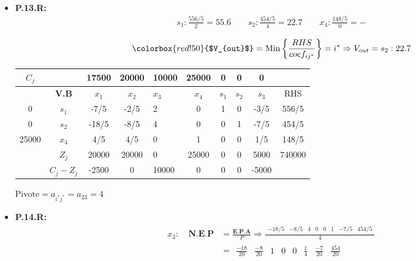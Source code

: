 \documentclass{templateNote}
\begin{document}
\begin{itemize}
    \item \textbf{P.13.R:}
    \begin{align*}
        s_1: \frac{556/5}{2} = 55.6 \qquad s_2: \frac{454/5}{4} = 22.7 \qquad x_4: \frac{148/5}{0} = - \\
    \end{align*}
    \begin{equation*}
        \colorbox{red!50}{$V_{out}$} = \text{Min} \left\{ \frac{RHS}{coef_{ij^*}} \right\} = i^* \Rightarrow V_{out} = s_2 : 22.7
    \end{equation*}

    \begin{center}
        \begin{tabular}{|c|c|c|c|g|c|c|c|c|c|}
            \hline
            $C_j$ & & 17500 & 20000 & 10000 & 25000 & 0 & 0 & 0 & \\ \hline
            & \textbf{V.B} & $x_1$ & $x_2$ & $x_3$ & $x_4$ & $s_1$ & $s_2$ & $s_3$ & RHS \\  & $s_1$ & -7/5 & -2/5 & 2 & 0 & 1 & 0 & -3/5 & 556/5 \\
            0 & $s_2$ & -18/5 & -8/5 & 4 & 0 & 0 & 1 & -7/5 & 454/5 \\
            25000 & $x_4$ & 4/5 & 4/5 & 0 & 1 & 0 & 0 & 1/5 & 148/5 \\ \hline
            & $Z_j$ & 20000 & 20000 & 0 & 25000 & 0 & 0 & 5000 & $\underline{740000}$ \\ \hline
            & $C_j - Z_j$ & -2500 & 0 & 10000 & 0 & 0 & 0 & -5000 & \\ \hline
        \end{tabular}
    \end{center}
    \begin{center}
        $\text{Pivote} = a_{i^*j^*} = a_{23} = 4$
    \end{center}

    \item \textbf{P.14.R:}
    \begin{align*}
        x_3: \quad \textbf{N.E.P} &= \frac{\textbf{E.P.A}}{P} \Rightarrow \frac{\begin{array}{cccccccc} -18/5 & -8/5 & 4 & 0 & 0 & 1 & -7/5 & 454/5\end{array}}{4} \\ &= \begin{array}{cccccccc} \frac{-18}{20} & \frac{-8}{20} & 1 & 0 & 0 & \frac{1}{4} & \frac{-7}{20} & \frac{454}{20}\end{array}
    \end{align*}


\end{itemize}
\end{document}
